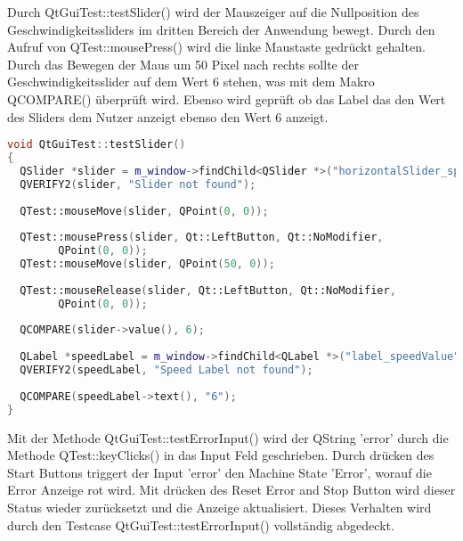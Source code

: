 		Durch QtGuiTest::testSlider() wird der Mauszeiger auf die Nullposition des Geschwindigkeitssliders im dritten Bereich der Anwendung bewegt. Durch den Aufruf von QTest::mousePress() wird die linke Maustaste gedrückt gehalten. Durch das Bewegen der Maus um 50 Pixel nach rechts sollte der Geschwindigkeitsslider auf dem Wert 6 stehen, was mit dem Makro QCOMPARE() überprüft wird. Ebenso wird geprüft ob das Label das den Wert des Sliders dem Nutzer anzeigt ebenso den Wert 6 anzeigt.
		\begin{lstlisting}[language=C++]
void QtGuiTest::testSlider()
{
  QSlider *slider = m_window->findChild<QSlider *>("horizontalSlider_speed");
  QVERIFY2(slider, "Slider not found");
	
  QTest::mouseMove(slider, QPoint(0, 0));
	
  QTest::mousePress(slider, Qt::LeftButton, Qt::NoModifier, 
        QPoint(0, 0));
  QTest::mouseMove(slider, QPoint(50, 0));
	
  QTest::mouseRelease(slider, Qt::LeftButton, Qt::NoModifier, 
        QPoint(0, 0));
	
  QCOMPARE(slider->value(), 6);
	
  QLabel *speedLabel = m_window->findChild<QLabel *>("label_speedValue");
  QVERIFY2(speedLabel, "Speed Label not found");
	
  QCOMPARE(speedLabel->text(), "6");
}
		\end{lstlisting}
		Mit der Methode QtGuiTest::testErrorInput() wird der QString 'error' durch die Methode QTest::keyClicks() in das Input Feld geschrieben. Durch drücken des Start Buttons triggert der Input 'error' den Machine State 'Error', worauf die Error Anzeige rot wird. Mit drücken des Reset Error and Stop Button wird dieser Status wieder zurücksetzt und die Anzeige aktualisiert. Dieses Verhalten wird durch den Testcase QtGuiTest::testErrorInput() vollständig abgedeckt.
